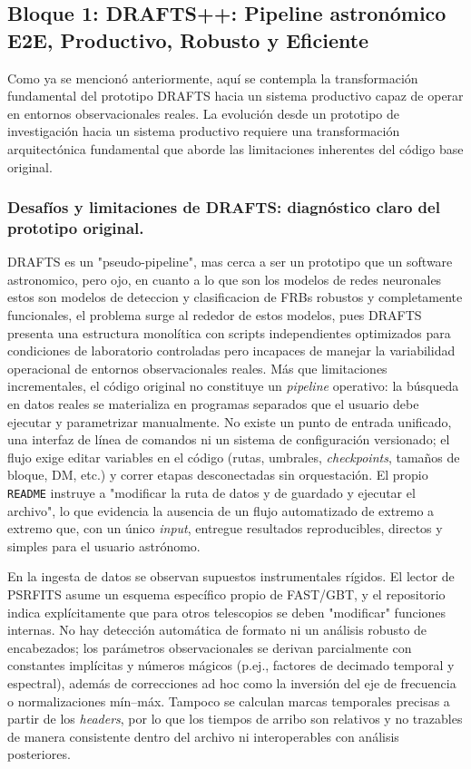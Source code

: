 \subsection{Bloque 1: DRAFTS++: Pipeline astronómico E2E, Productivo, Robusto y Eficiente}

Como ya se mencionó anteriormente, aquí se contempla la transformación fundamental del prototipo DRAFTS hacia un sistema productivo capaz de operar en entornos observacionales reales. La evolución desde un prototipo de investigación hacia un sistema productivo requiere una transformación arquitectónica fundamental que aborde las limitaciones inherentes del código base original.

\subsubsection{Desafíos y limitaciones de DRAFTS: diagnóstico claro del prototipo original.}

DRAFTS es un "pseudo-pipeline", mas cerca a ser un prototipo que un software astronomico, pero ojo, en cuanto a lo que son los modelos de redes neuronales estos son modelos de deteccion y clasificacion de FRBs robustos y completamente funcionales, el problema surge al rededor de estos modelos, pues DRAFTS presenta una estructura monolítica con scripts independientes optimizados para condiciones de laboratorio controladas pero incapaces de manejar la variabilidad operacional de entornos observacionales reales. Más que limitaciones incrementales, el código original no constituye un \emph{pipeline} operativo: la búsqueda en datos reales se materializa en programas separados que el usuario debe ejecutar y parametrizar manualmente. No existe un punto de entrada unificado, una interfaz de línea de comandos ni un sistema de configuración versionado; el flujo exige editar variables en el código (rutas, umbrales, \textit{checkpoints}, tamaños de bloque, DM, etc.) y correr etapas desconectadas sin orquestación. El propio \texttt{README} instruye a "modificar la ruta de datos y de guardado y ejecutar el archivo", lo que evidencia la ausencia de un flujo automatizado de extremo a extremo que, con un único \emph{input}, entregue resultados reproducibles, directos y simples para el usuario astrónomo.

En la ingesta de datos se observan supuestos instrumentales rígidos. El lector de PSRFITS asume un esquema específico propio de FAST/GBT, y el repositorio indica explícitamente que para otros telescopios se deben "modificar" funciones internas. No hay detección automática de formato ni un análisis robusto de encabezados; los parámetros observacionales se derivan parcialmente con constantes implícitas y números mágicos (p.ej., factores de decimado temporal y espectral), además de correcciones ad hoc como la inversión del eje de frecuencia o normalizaciones mín--máx. Tampoco se calculan marcas temporales precisas a partir de los \emph{headers}, por lo que los tiempos de arribo son relativos y no trazables de manera consistente dentro del archivo ni interoperables con análisis posteriores.

